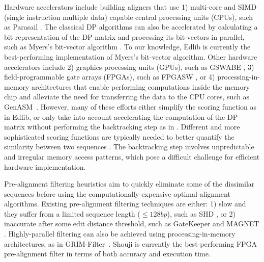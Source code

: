 Hardware accelerators include building aligners that use 1) multi-core and SIMD (single instruction multiple data) capable central processing units (CPUs), such as Parasail \citep{daily2016parasail}.
The classical DP algorithms can also be accelerated by calculating a bit representation of the DP matrix and processing its bit-vectors in parallel, such as Myers's bit-vector algorithm \citep{myers1999fast}. To our knowledge, Edlib \citep{vsovsic2017edlib} is currently the best-performing implementation of Myers's bit-vector algorithm. 
Other hardware accelerators include 2) graphics processing units (GPUs), such as GSWABE \citep{liu2015gswabe}, 3) field-programmable gate arrays (FPGAs), such as FPGASW \citep{fei2018fpgasw}, or 4) {processing-in-memory architectures that enable performing computations inside the memory chip and alleviate the need for transferring the data to the CPU cores, such as} GenASM~\citep{senolcalimicro2020}. However, many of these efforts either simplify the scoring function as in Edlib, or only take into account accelerating the computation of the DP matrix without performing the backtracking step as in \citep{ chen2014accelerating}. Different and more sophisticated scoring functions are typically needed to better quantify the similarity between two sequences \citep{wang2011comparison}. The backtracking step involves unpredictable and irregular memory access patterns, which pose a difficult challenge for efficient hardware implementation.

Pre-alignment filtering heuristics aim to quickly eliminate some of the dissimilar sequences before using the computationally-expensive optimal alignment algorithms.
Existing pre-alignment filtering techniques are either: 1) slow and they suffer from a limited sequence length ($\leq128 bp$), such as SHD \citep{xin2015shifted}, or 2) inaccurate after some edit distance threshold, such as GateKeeper \citep{alser2017gatekeeper} and MAGNET \citep{alser2017magnet1}.
{Highly-parallel filtering can also be achieved using processing-in-memory architectures, as in} GRIM-Filter~\citep{kim2018grim}.
Shouji \citep{alser2019shouji} is currently the best-performing FPGA pre-alignment filter in terms of both accuracy and execution time.

